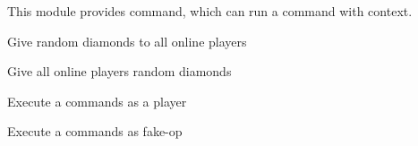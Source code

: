 
This module provides  command, which can run a command with context.


\begin{example}{Give random diamonds to all online players}
\end{example}

\begin{example}{Give all online players random diamonds}
\end{example}

\begin{example}{Execute a commands as a player}
\end{example}

\begin{example}{Execute a commands as fake-op}
\end{example}


